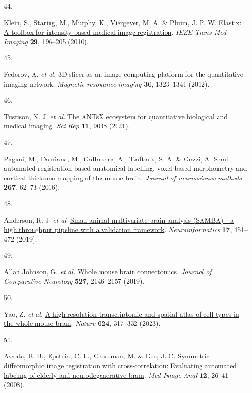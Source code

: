 \documentclass[
  12pt,
]{article}
\newlength{\cslhangindent}
\newlength{\csllabelwidth}
\newenvironment{CSLReferences}[2] %
 {\begin{list}{}{%
  \setlength{\itemindent}{0pt}
  \setlength{\leftmargin}{0pt}
  \setlength{\parsep}{0pt}
  \ifodd #1
   \setlength{\leftmargin}{\cslhangindent}
   \setlength{\itemindent}{-1\cslhangindent}
  \fi
  \setlength{\itemsep}{#2\baselineskip}}}
 {\end{list}}
\newcommand{\CSLLeftMargin}[1]{\parbox[t]{\csllabelwidth}{\strut#1\strut}}
\newcommand{\CSLRightInline}[1]{\parbox[t]{\linewidth - \csllabelwidth}{\strut#1\strut}}
\begin{document}
\begin{CSLReferences}{0}{0}
\CSLLeftMargin{44. }%
\CSLRightInline{Klein, S., Staring, M., Murphy, K., Viergever, M. A. \&
Pluim, J. P. W. \href{https://doi.org/10.1109/TMI.2009.2035616}{Elastix:
A toolbox for intensity-based medical image registration}. \emph{IEEE
Trans Med Imaging} \textbf{29}, 196--205 (2010).}

\CSLLeftMargin{45. }%
\CSLRightInline{Fedorov, A. \emph{et al.} 3D slicer as an image
computing platform for the quantitative imaging network. \emph{Magnetic
resonance imaging} \textbf{30}, 1323--1341 (2012).}

\CSLLeftMargin{46. }%
\CSLRightInline{Tustison, N. J. \emph{et al.}
\href{https://doi.org/10.1038/s41598-021-87564-6}{The ANTsX ecosystem
for quantitative biological and medical imaging}. \emph{Sci Rep}
\textbf{11}, 9068 (2021).}

\CSLLeftMargin{47. }%
\CSLRightInline{Pagani, M., Damiano, M., Galbusera, A., Tsaftaris, S. A.
\& Gozzi, A. Semi-automated registration-based anatomical labelling,
voxel based morphometry and cortical thickness mapping of the mouse
brain. \emph{Journal of neuroscience methods} \textbf{267}, 62--73
(2016).}

\CSLLeftMargin{48. }%
\CSLRightInline{Anderson, R. J. \emph{et al.}
\href{https://doi.org/10.1007/s12021-018-9410-0}{Small animal
multivariate brain analysis (SAMBA) - a high throughput pipeline with a
validation framework}. \emph{Neuroinformatics} \textbf{17}, 451--472
(2019).}

\CSLLeftMargin{49. }%
\CSLRightInline{Allan Johnson, G. \emph{et al.} Whole mouse brain
connectomics. \emph{Journal of Comparative Neurology} \textbf{527},
2146--2157 (2019).}

\CSLLeftMargin{50. }%
\CSLRightInline{Yao, Z. \emph{et al.}
\href{https://doi.org/10.1038/s41586-023-06812-z}{A high-resolution
transcriptomic and spatial atlas of cell types in the whole mouse
brain}. \emph{Nature} \textbf{624}, 317--332 (2023).}

\CSLLeftMargin{51. }%
\CSLRightInline{Avants, B. B., Epstein, C. L., Grossman, M. \& Gee, J.
C. \href{https://doi.org/10.1016/j.media.2007.06.004}{Symmetric
diffeomorphic image registration with cross-correlation: Evaluating
automated labeling of elderly and neurodegenerative brain}. \emph{Med
Image Anal} \textbf{12}, 26--41 (2008).}


\end{CSLReferences}
\end{document}
